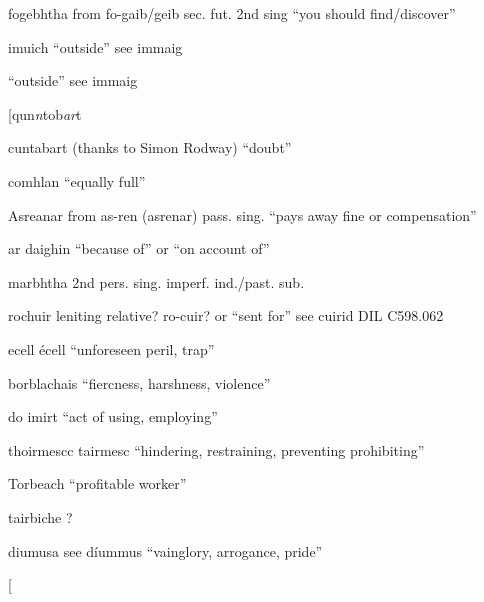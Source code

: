 \documentclass[11pt]{article}
\begin{document}
  \item[fogebhtha] from fo-gaib/geib sec. fut. 2nd sing \enquote{you should find/discover}

  \item[imuich] \enquote{outside} see immaig

  \item[\enquote{outside} see immaig 
  
  \item[qun\emph{n}tob\emph{ar}t] cuntabart (thanks to Simon Rodway) \enquote{doubt}

  \item[comhlan] \enquote{equally full}

  \item[Asreanar] from as-ren (asrenar) pass. sing. \enquote{pays away fine or compensation}

  \item[ar daighin] \enquote{because of} or \enquote{on account of}
  \item[marbhtha] 2nd pers. sing. imperf. ind./past. sub.
  \item[rochuir] leniting relative? ro-cuir? or \enquote{sent for} see cuirid DIL C598.062
  \item[ecell] \'{e}cell \enquote{unforeseen peril, trap}
  \item[borblachais] \enquote{fiercness, harshness, violence}
  \item[do imirt] \enquote{act of using, employing}
  \item[thoirmescc] tairmesc \enquote{hindering, restraining, preventing prohibiting}
  \item[Torbeach] \enquote{profitable worker}
  \item[tairbiche] ? 
  \item[diumusa] see d\'{i}ummus \enquote{vainglory, arrogance, pride}
  \item[
\end{document}
